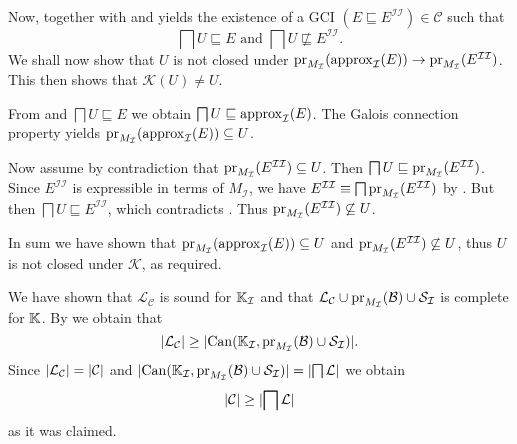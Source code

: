 \begin{Proof}

  Now,  together with  and  yields the
  existence of a GCI $(E \sqsubseteq E^{\mathcal{I}\mathcal{I}}) \in \mathcal{C}$ such
  that
  \begin{equation}
    \label{eq:33}
    \bigsqcap U \sqsubseteq E \text{ and } \bigsqcap U \not\sqsubseteq E^{\mathcal{I}\mathcal{I}}.
  \end{equation}
  We shall now show that $U$ is not closed under
  $\operatorname{pr}_{M_{\mathcal{I}}}(\operatorname{approx}_{\mathcal{I}}(E)) \to
  \operatorname{pr}_{M_{\mathcal{I}}}(E^{\mathcal{I}\mathcal{I}})$.  This then shows that
  $\mathcal{K}(U) \neq U$.

  From  and $\bigsqcap U \sqsubseteq E$ we obtain $\bigsqcap U
  \sqsubseteq \operatorname{approx}_{\mathcal{I}}(E)$.  The Galois connection property
   yields
  $\operatorname{pr}_{M_{\mathcal{I}}}(\operatorname{approx}_{\mathcal{I}}(E)) \subseteq U$.

  Now assume by contradiction that $\operatorname{pr}_{M_{\mathcal{I}}}(E^{\mathcal{I}\mathcal{I}})
  \subseteq U$.  Then $\bigsqcap U \sqsubseteq
  \operatorname{pr}_{M_{\mathcal{I}}}(E^{\mathcal{I}\mathcal{I}})$.  Since $E^{\mathcal{I}\mathcal{I}}$
  is expressible in terms of $M_{\mathcal{I}}$, we have $E^{\mathcal{I}\mathcal{I}} \equiv
  \bigsqcap \operatorname{pr}_{M_{\mathcal{I}}}(E^{\mathcal{I}\mathcal{I}})$ by
  .  But then $\bigsqcap U \sqsubseteq
  E^{\mathcal{I}\mathcal{I}}$, which contradicts .  Thus
  $\operatorname{pr}_{M_{\mathcal{I}}}(E^{\mathcal{I}\mathcal{I}}) \not\subseteq U$.

  In sum we have shown that $\operatorname{pr}_{M_{\mathcal{I}}}(\operatorname{approx}_{\mathcal{I}}(E)) \subseteq U$
  and $\operatorname{pr}_{M_{\mathcal{I}}}(E^{\mathcal{I}\mathcal{I}}) \not\subseteq U$, thus $U$ is not
  closed under $\mathcal{K}$, as required.

  We have shown that $\mathcal{L}_{\mathcal{C}}$ is sound for ${\mathbb{K}}_{\mathcal{I}}$ and
  that $\mathcal{L}_{\mathcal{C}} \cup \operatorname{pr}_{M_{\mathcal{I}}}(\mathcal{B}) \cup
  \mathcal{S}_{\mathcal{I}}$ is complete for ${\mathbb{K}}$.  By
   we obtain that
  \begin{equation*}
    \lvert \mathcal{L}_{\mathcal{C}} \rvert \ge \lvert \operatorname{Can}({\mathbb{K}}_{\mathcal{I}},
      \operatorname{pr}_{M_{\mathcal{I}}}(\mathcal{B}) \cup \mathcal{S}_{\mathcal{I}} ) \rvert.
  \end{equation*}
  Since $\lvert \mathcal{L}_{\mathcal{C}} \rvert = \lvert \mathcal{C} \rvert$ and $\lvert \operatorname{Can}({\mathbb{K}}_{\mathcal{I}}, \operatorname{pr}_{M_{\mathcal{I}}}(\mathcal{B}) \cup \mathcal{S}_{\mathcal{I}}) \rvert
  = \lvert \bigsqcap \mathcal{L} \rvert$ we obtain
  \begin{equation*}
    \lvert \mathcal{C} \rvert \geq \lvert \bigsqcap \mathcal{L} \rvert
  \end{equation*}
  as it was claimed.
\end{Proof}

